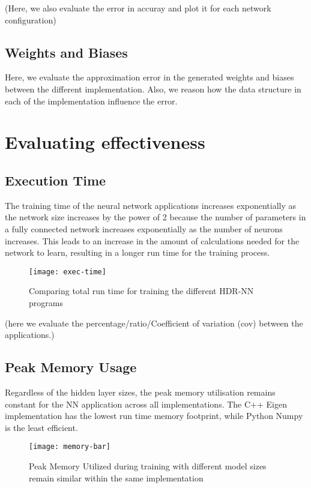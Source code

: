 (Here, we also evaluate the error in accuray and plot it for each network configuration)

\subsection{Weights and Biases}
Here, we evaluate the approximation error in the generated weights and biases between the different implementation. Also, we reason how the data structure in each of the implementation influence the error.


\section{Evaluating effectiveness}
\subsection{Execution Time}
The training time of the neural network applications increases exponentially as the network size increases by the power of 2 because the number of parameters in a fully connected network increases exponentially as the number of neurons increases. This leads to an increase in the amount of calculations needed for the network to learn, resulting in a longer run time for the training process.

\begin{figure}[ht]
	\centering
	\texttt{[image: exec-time]}
	\caption[Execution Time vs Model Parameters]{Comparing total run time for training the different HDR-NN programs}
\end{figure}

(here we evaluate the percentage/ratio/Coefficient of variation (cov) between the applications.)

\subsection{Peak Memory Usage}
Regardless of the hidden layer sizes, the peak memory utilisation remains constant for the NN application across all implementations. The C++ Eigen implementation has the lowest run time memory footprint, while Python Numpy is the least efficient.

\begin{figure}[ht]
	\centering
	\texttt{[image: memory-bar]}
	\caption[Peak Memory Utilisation]{Peak Memory Utilized during training with different model sizes remain similar within the same implementation}
\end{figure}

